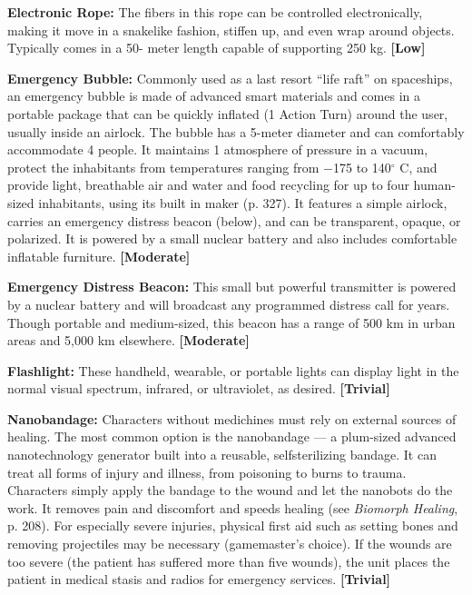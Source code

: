\textbf{Electronic Rope:} The fibers in this rope can be controlled electronically, making it move in a snakelike fashion, stiffen up, and even wrap around objects. Typically comes in a 50- meter length capable of supporting 250 kg. \textbf{[Low]}

\textbf{Emergency Bubble:} Commonly used as a last resort ``life raft'' on spaceships, an emergency bubble is made of advanced smart materials and comes in a portable package that can be quickly inflated (1 Action Turn) around the user, usually inside an airlock. The bubble has a 5-meter diameter and can comfortably accommodate 4 people. It maintains 1 atmosphere of pressure in a vacuum, protect the inhabitants from temperatures ranging from $-$175 to 140$^{\circ}$ C, and provide light, breathable air and water and food recycling for up to four human-sized inhabitants, using its built in maker (p. 327). It features a simple airlock, carries an emergency distress beacon (below), and can be transparent, opaque, or polarized. It is powered by a small nuclear battery and also includes comfortable inflatable furniture. \textbf{[Moderate]}

\textbf{Emergency Distress Beacon:} This small but powerful transmitter is powered by a nuclear battery and will broadcast any programmed distress call for years. Though portable and medium-sized, this beacon has a range of 500 km in urban areas and 5,000 km elsewhere. \textbf{[Moderate]}

\textbf{Flashlight:} These handheld, wearable, or portable lights can display light in the normal visual spectrum, infrared, or ultraviolet, as desired. \textbf{[Trivial]}

\textbf{Nanobandage:} Characters without medichines must rely on external sources of healing. The most common option is the nanobandage --- a plum-sized advanced nanotechnology generator built into a reusable, selfsterilizing bandage. It can treat all forms of injury and illness, from poisoning to burns to trauma. Characters simply apply the bandage to the wound and let the nanobots do the work. It removes pain and discomfort and speeds healing (see \emph{Biomorph Healing}, p. 208). For especially severe injuries, physical first aid such as setting bones and removing projectiles may be necessary (gamemaster’s choice). If the wounds are too severe (the patient has suffered more than five wounds), the unit places the patient in medical stasis and radios for emergency services. \textbf{[Trivial]}

